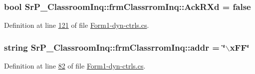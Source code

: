 \hypertarget{class_sr_p___classroom_inq_1_1frm_classrrom_inq_a65b6633a5bc7bff8142fcace6bfba3f8}{
\subsubsection[{\-Ack\-R\-Xd}]{\setlength{\rightskip}{0pt plus 5cm}bool {\bf \-Sr\-P\-\_\-\-Classroom\-Inq\-::frm\-Classrrom\-Inq\-::\-Ack\-R\-Xd} = false}}
\label{class_sr_p___classroom_inq_1_1frm_classrrom_inq_a65b6633a5bc7bff8142fcace6bfba3f8}


\-Definition at line \hyperlink{_form1-dyn-ctrls_8cs_source_l00121}{121} of file \hyperlink{_form1-dyn-ctrls_8cs_source}{\-Form1-\/dyn-\/ctrls.\-cs}.

\hypertarget{class_sr_p___classroom_inq_1_1frm_classrrom_inq_ab99245163109493292f36ab5011c4f76}{
\subsubsection[{addr}]{\setlength{\rightskip}{0pt plus 5cm}string {\bf \-Sr\-P\-\_\-\-Classroom\-Inq\-::frm\-Classrrom\-Inq\-::addr} = \char`\"{}$\backslash$x\-F\-F\char`\"{}}}
\label{class_sr_p___classroom_inq_1_1frm_classrrom_inq_ab99245163109493292f36ab5011c4f76}


\-Definition at line \hyperlink{_form1-dyn-ctrls_8cs_source_l00082}{82} of file \hyperlink{_form1-dyn-ctrls_8cs_source}{\-Form1-\/dyn-\/ctrls.\-cs}.

